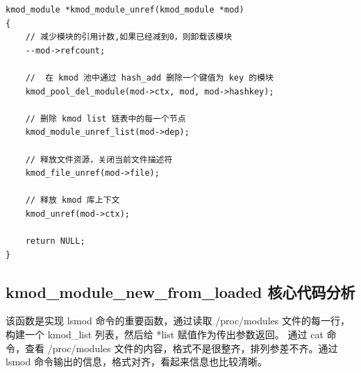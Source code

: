 {\begin{shaded}\begin{verbatim}
kmod_module *kmod_module_unref(kmod_module *mod)
{
    // 减少模块的引用计数,如果已经减到0，则卸载该模块
    --mod->refcount;

    //  在 kmod 池中通过 hash_add 删除一个键值为 key 的模块
    kmod_pool_del_module(mod->ctx, mod, mod->hashkey);

    // 删除 kmod list 链表中的每一个节点
    kmod_module_unref_list(mod->dep);

    // 释放文件资源，关闭当前文件描述符
    kmod_file_unref(mod->file);

    // 释放 kmod 库上下文
    kmod_unref(mod->ctx);

    return NULL;
}
\end{verbatim}\end{shaded}}
\subsection{kmod\_module\_new\_from\_loaded 核心代码分析}

该函数是实现 lsmod 命令的重要函数，通过读取 /proc/modules
文件的每一行，构建一个 kmod\_list 列表，然后给 *list
赋值作为传出参数返回。 通过 cat 命令，查看 /proc/modules
文件的内容，格式不是很整齐，排列参差不齐。通过 lsmod
命令输出的信息，格式对齐，看起来信息也比较清晰。

